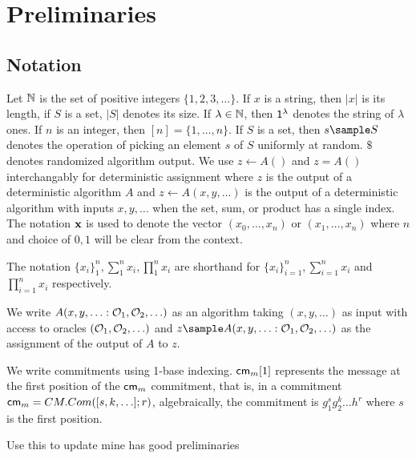 % 
% 



\section{Preliminaries}\label{sec:preliminaries}
\subsection{Notation}
Let $\mathbb{N}$ is the set of positive integers $\{1,2,3,\ldots\}$. If $x$ is a string, then $|x|$ is its length, if $S$ is a set, $|S|$ denotes its size. If $\lambda \in \mathbb{N}$, then $\mathsf{1^{\lambda}}$ denotes the string of $\lambda$ ones. If $n$ is an integer, then $[n] = \{1, \ldots,n\}.$ If $S$ is a set, then $s \sample S$ denotes the operation of picking an element $s$ of $S$ uniformly at random. $\$$ denotes randomized algorithm output. We use $z \gets A()$ and $z = A()$ interchangably for deterministic assignment where $z$ is the output of a deterministic algorithm $A$ and $z \gets A(x,y,\ldots)$ is the output of a deterministic algorithm with inputs $x,y,\ldots$ when the set, sum, or product has a single index. 
The notation $\textbf{x}$ is used to denote the vector $(x_0, \ldots,x_n)$ or $(x_1, \ldots, x_n)$ where $n$ and choice of $0, 1$ will be clear from the context.

The notation $\{x_i\}_1^n, \sum_1^n x_i, \prod_1^n x_i$ are shorthand for $\{x_i\}_{i=1}^n, \sum_{i=1}^n x_i$ and $\prod_{i=1}^n x_i$ respectively. 

We write $A(x,y,\ldots : \mathcal{O}_1, \mathcal{O}_2, \ldots)$ as an algorithm taking $(x,y,\ldots)$ as input with access to oracles $(\mathcal{O}_1, \mathcal{O}_2, \ldots)$ and $z \sample A(x,y,\ldots : \oracle_1, \oracle_2, \ldots)$ as the assignment of the output of $A$ to $z$.

We write commitments using 1-base indexing. $\mathsf{cm}_m[1]$ represents the message at the first position of the $\mathsf{cm}_m$ commitment, that is, in a commitment $\mathsf{cm}_m = CM.Com([s,k,\ldots];r)$, algebraically, the commitment is $g_1^sg_2^k\ldots h^r$ where $s$ is the first position.


Use this to update mine
\cite{hutchison_get_2010} has good preliminaries


